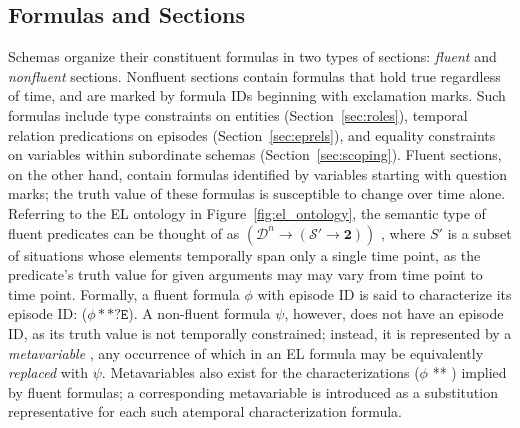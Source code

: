 \subsection{Formulas and Sections}
\label{sec:forms_secs}
Schemas organize their constituent formulas in two types of sections: \textit{fluent} and \textit{nonfluent} sections.
Nonfluent sections contain formulas that hold true regardless of time, and are marked by formula IDs beginning with exclamation marks.
Such formulas include type constraints on entities (Section~\ref{sec:roles}), temporal relation predications on episodes (Section~\ref{sec:eprels}), and equality constraints on variables within subordinate schemas (Section~\ref{sec:scoping}).
Fluent sections, on the other hand, contain formulas identified by variables starting with question marks; the truth value of these formulas is susceptible to change over time alone.
Referring to the EL ontology in Figure~\ref{fig:el_ontology}, the semantic type of fluent predicates can be thought of as $(\mathcal{D}^{n} \rightarrow (\mathcal{S'} \rightarrow \textbf{2}))$ , where $S'$ is a subset of situations whose elements temporally span only a single time point, as the predicate's truth value for given arguments may may vary from time point to time point.
Formally, a fluent formula $\phi$ with episode ID  is said to characterize its episode ID: ($\phi ** \texttt{?E}$).
A non-fluent formula $\psi$, however, does not have an episode ID, as its truth value is not temporally constrained; instead, it is represented by a \textit{metavariable} , any occurrence of which in an EL formula may be equivalently \textit{replaced} with $\psi$.
Metavariables also exist for the characterizations ($\phi$ ** ) implied by fluent formulas; a corresponding metavariable  is introduced as a substitution representative for each such atemporal characterization formula.

